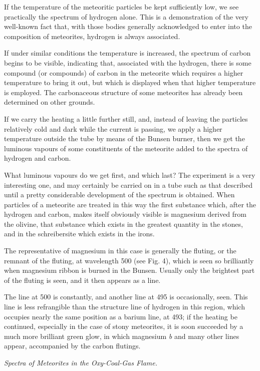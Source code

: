 \documentclass[a4paper, 12pt, oneside, polutonikogreek, english]{article}
\begin{document}
If the temperature of the meteoritic particles be kept sufficiently low, we see practically the spectrum of hydrogen alone. This is a demonstration of the very well-known fact that, with those bodies generally acknowledged to enter into the composition of meteorites, hydrogen is always associated.

If under similar conditions the temperature is increased, the spectrum of carbon begins to be visible, indicating that, associated with the hydrogen, there is some compound (or compounds) of carbon in the meteorite which requires a higher temperature to bring it out, but which is displayed when that higher temperature is employed. The carbonaceous structure of some meteorites has already been determined on other grounds.

If we carry the heating a little further still, and, instead of leaving the particles relatively cold and dark while the current is passing, we apply a higher temperature outside the tube by means of the Bunsen burner, then we get the luminous vapours of some constituents of the meteorite added to the spectra of hydrogen and carbon.

What luminous vapours do we get first, and which last? The experiment is a very interesting one, and may certainly be carried on in a tube such as that described until a pretty considerable development of the spectrum is obtained. When particles of a meteorite are treated in this way the first substance which, after the hydrogen and carbon, makes itself obviously visible is magnesium derived from the olivine, that substance which exists in the greatest quantity in the stones, and in the schreibersite which exists in the irons.

The representative of magnesium in this case is generally the fluting, or the remnant of the fluting, at wavelength 500 (see Fig. 4), which is seen so brilliantly when magnesium ribbon is burned in the Bunsen. Usually only the brightest part of the fluting is seen, and it then appears as a line.

The line at 500 is constantly, and another line at 495 is occasionally, seen. This line is less refrangible than the structure line of hydrogen in this region, which occupies nearly the same position as a barium line, at 493; if the heating be continued, especially in the case of stony meteorites, it is soon succeeded by a much more brilliant green glow, in which magnesium \emph{b} and many other lines appear, accompanied by the carbon flutings.

\emph{Spectra of Meteorites in the Oxy-Coal-Gas Flame.}
\end{document}
